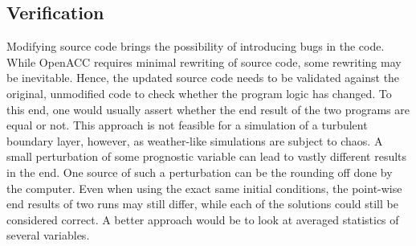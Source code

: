 \subsection{Verification}
Modifying source code brings the possibility of introducing bugs in the code. While OpenACC requires minimal rewriting of source code, some rewriting may be inevitable. Hence, the updated source code needs to be validated against the original, unmodified code to check whether the program logic has changed. To this end, one would usually assert whether the end result of the two programs are equal or not. This approach is not feasible for a simulation of a turbulent boundary layer, however, as weather-like simulations are subject to chaos. A small perturbation of some prognostic variable can lead to vastly different results in the end. One source of such a perturbation can be the rounding off done by the computer. Even when using the exact same initial conditions, the point-wise end results of two runs may still differ, while each of the solutions could still be considered correct. A better approach would be to look at averaged statistics of several variables. 

